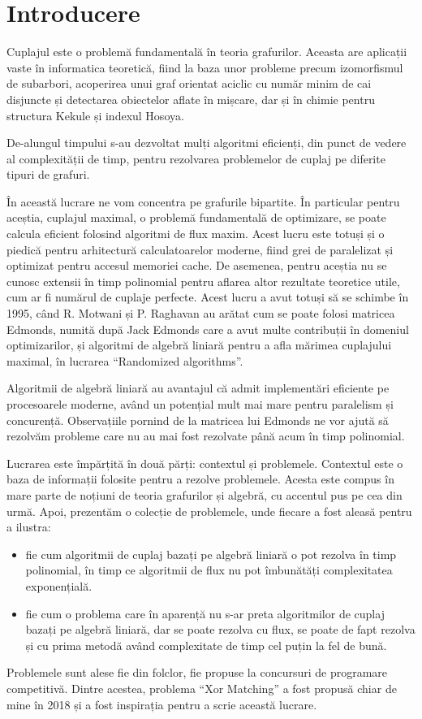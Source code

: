 \chapter{Introducere}

Cuplajul este o problemă fundamentală în teoria grafurilor. Aceasta are
aplicații vaste în informatica teoretică, fiind la baza unor probleme precum
izomorfismul de subarbori, acoperirea unui graf orientat aciclic cu număr minim
de cai disjuncte și detectarea obiectelor aflate în mișcare, dar și în chimie
pentru structura Kekule și indexul Hosoya. \par

De-alungul timpului s-au dezvoltat mulți algoritmi eficienți, din punct de
vedere al complexității de timp, pentru rezolvarea problemelor de cuplaj pe
diferite tipuri de grafuri. \par

În această lucrare ne vom concentra pe grafurile bipartite. În particular pentru
aceștia, cuplajul maximal, o problemă fundamentală de optimizare, se poate
calcula eficient folosind algoritmi de flux maxim. Acest lucru este totuși și o
piedică pentru arhitectură calculatoarelor moderne, fiind grei de paralelizat și
optimizat pentru accesul memoriei cache. De asemenea, pentru aceștia nu se
cunosc extensii în timp polinomial pentru aflarea altor rezultate teoretice
utile, cum ar fi numărul de cuplaje perfecte. Acest lucru a avut totuși să se
schimbe în 1995, când R. Motwani și P. Raghavan au arătat cum se poate folosi
matricea Edmonds, numită după Jack Edmonds care a avut multe contribuții în
domeniul optimizarilor, și algoritmi de algebră liniară pentru a afla mărimea
cuplajului maximal, în lucrarea ``Randomized algorithms''\cite{randomizedalgorithms}. \par

Algoritmii de algebră liniară au avantajul că admit implementări eficiente pe
procesoarele moderne, având un potențial mult mai mare pentru paralelism și
concurență. Observațiile pornind de la matricea lui Edmonds ne vor ajută să rezolvăm
probleme care nu au mai fost rezolvate până acum în timp polinomial. \par

Lucrarea este împărțită în două părți: contextul și problemele. Contextul este o
baza de informații folosite pentru a rezolve problemele. Acesta este compus în
mare parte de noțiuni de teoria grafurilor și algebră, cu accentul pus pe cea din
urmă. Apoi, prezentăm o colecție de problemele, unde fiecare a fost aleasă pentru
a ilustra:
\begin{itemize}
    \item fie cum algoritmii de cuplaj bazați pe algebră liniară o pot rezolva în
    timp polinomial, în timp ce algoritmii de flux nu pot îmbunătăți complexitatea
    exponențială.
    \item fie cum o problema care în aparență nu s-ar preta algoritmilor de cuplaj
    bazați pe algebră liniară, dar se poate rezolva cu flux, se poate de fapt rezolva
    și cu prima metodă având complexitate de timp cel puțin la fel de bună.
\end{itemize}

Problemele sunt alese fie din folclor, fie propuse la concursuri de
programare competitivă. Dintre acestea, problema ``Xor Matching'' a fost propusă
chiar de mine în 2018 și a fost inspirația pentru a scrie această lucrare.
